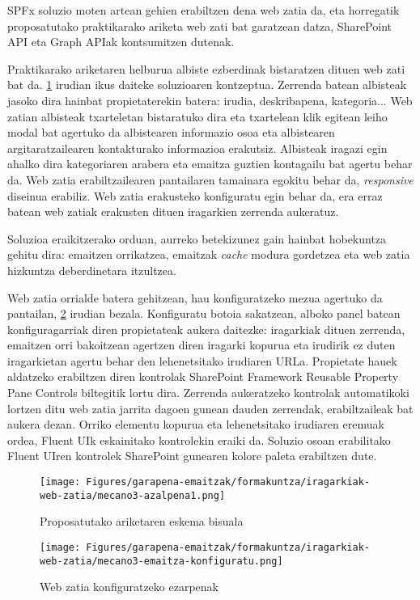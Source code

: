 SPFx soluzio moten artean gehien erabiltzen dena web zatia da, eta horregatik proposatutako praktikarako ariketa web zati bat garatzean
datza, SharePoint API eta Graph APIak kontsumitzen dutenak.

Praktikarako ariketaren helburua albiste ezberdinak bistaratzen dituen web
zati bat da. \ref{ads-template} irudian ikus daiteke soluzioaren kontzeptua. Zerrenda batean albisteak jasoko dira hainbat propietaterekin batera: irudia, deskribapena, kategoria... Web zatian
albisteak txarteletan bistaratuko dira eta txartelean klik egitean leiho modal bat agertuko da albistearen informazio osoa eta albistearen
argitaratzailearen kontakturako informazioa erakutsiz. Albisteak iragazi egin ahalko dira kategoriaren arabera eta emaitza guztien
kontagailu bat agertu behar da. Web zatia erabiltzailearen pantailaren tamainara egokitu behar da, \textit{responsive} diseinua erabiliz.
Web zatia erakusteko konfiguratu egin behar da, era erraz batean web zatiak erakusten dituen iragarkien zerrenda aukeratuz. 

Soluzioa eraikitzerako orduan, aurreko betekizunez gain hainbat hobekuntza gehitu dira: emaitzen orrikatzea, emaitzak \textit{cache}
modura gordetzea eta web zatia hizkuntza deberdinetara itzultzea.

Web zatia orrialde batera gehitzean, hau konfiguratzeko mezua agertuko da pantailan, \ref{ads-configuration} irudian bezala. Konfiguratu botoia sakatzean, alboko panel batean
konfiguragarriak diren propietateak aukera daitezke: iragarkiak dituen zerrenda, emaitzen orri bakoitzean agertzen diren iragarki
kopurua eta irudirik ez duten iragarkietan agertu behar den lehenetsitako irudiaren URLa. Propietate hauek aldatzeko erabiltzen diren
kontrolak SharePoint Framework Reusable Property Pane Controls biltegitik lortu dira. Zerrenda aukeratzeko kontrolak automatikoki
lortzen ditu web zatia jarrita dagoen gunean dauden zerrendak, erabiltzaileak bat aukera dezan. Orriko elementu kopurua eta lehenetsitako
irudiaren eremuak ordea, Fluent UIk eskainitako kontrolekin eraiki da. Soluzio osoan erabilitako Fluent UIren kontrolek SharePoint gunearen
kolore paleta erabiltzen dute.

\begin{figure}[H]
\centering
\texttt{[image: Figures/garapena-emaitzak/formakuntza/iragarkiak-web-zatia/mecano3-azalpena1.png]}
\caption{Proposatutako ariketaren eskema bisuala}
\label{ads-template}
\end{figure}

\begin{figure}[H]
\centering
\texttt{[image: Figures/garapena-emaitzak/formakuntza/iragarkiak-web-zatia/mecano3-emaitza-konfiguratu.png]}
\caption{Web zatia konfiguratzeko ezarpenak}
\label{ads-configuration}
\end{figure}

